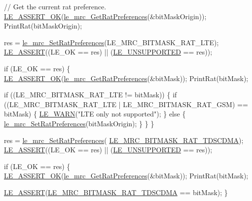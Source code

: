 \begin{DoxyCodeInclude}
{    \textcolor{comment}{// Get the current rat preference.}
    \hyperlink{le__log_8h_a7cd2daa3d4af1de4d29e0eed95187484}{LE\_ASSERT\_OK}(\hyperlink{le__mrc__interface_8h_ae9fa8655738c63e392c8dcc862bdb1d5}{le\_mrc\_GetRatPreferences}(&bitMaskOrigin));
    PrintRat(bitMaskOrigin);

    res = \hyperlink{le__mrc__interface_8h_a2d4abd391bc69c218538f5d8e1be4e01}{le\_mrc\_SetRatPreferences}(LE\_MRC\_BITMASK\_RAT\_LTE);
    \hyperlink{le__log_8h_ac0dbbef91dc0fed449d0092ff0557b39}{LE\_ASSERT}((LE\_OK == res) || (\hyperlink{le__basics_8h_a1cca095ed6ebab24b57a636382a6c86ca5377262702e8434207b03533259e0c5f}{LE\_UNSUPPORTED} == res));

    \textcolor{keywordflow}{if} (LE\_OK == res)
    \{
        \hyperlink{le__log_8h_a7cd2daa3d4af1de4d29e0eed95187484}{LE\_ASSERT\_OK}(\hyperlink{le__mrc__interface_8h_ae9fa8655738c63e392c8dcc862bdb1d5}{le\_mrc\_GetRatPreferences}(&bitMask));
        PrintRat(bitMask);

        \textcolor{keywordflow}{if} ((LE\_MRC\_BITMASK\_RAT\_LTE != bitMask))
        \{
            \textcolor{keywordflow}{if} ((LE\_MRC\_BITMASK\_RAT\_LTE | LE\_MRC\_BITMASK\_RAT\_GSM) == bitMask)
            \{
                \hyperlink{le__log_8h_a0201b2f60ee0e945479f91e181bf04b6}{LE\_WARN}(\textcolor{stringliteral}{"LTE only not supported"});
            \}
            \textcolor{keywordflow}{else}
            \{
                \hyperlink{le__mrc__interface_8h_a2d4abd391bc69c218538f5d8e1be4e01}{le\_mrc\_SetRatPreferences}(bitMaskOrigin);
            \}
        \}
    \}

    res = \hyperlink{le__mrc__interface_8h_a2d4abd391bc69c218538f5d8e1be4e01}{le\_mrc\_SetRatPreferences}(
      \hyperlink{le__mrc__interface_8h_af643c7005da7f2466302eebdf7a29d93a704e1357fc74db4ae2fef1548aa18bcc}{LE\_MRC\_BITMASK\_RAT\_TDSCDMA});
    \hyperlink{le__log_8h_ac0dbbef91dc0fed449d0092ff0557b39}{LE\_ASSERT}((LE\_OK == res) || (\hyperlink{le__basics_8h_a1cca095ed6ebab24b57a636382a6c86ca5377262702e8434207b03533259e0c5f}{LE\_UNSUPPORTED} == res));

    \textcolor{keywordflow}{if} (LE\_OK == res)
    \{
        \hyperlink{le__log_8h_a7cd2daa3d4af1de4d29e0eed95187484}{LE\_ASSERT\_OK}(\hyperlink{le__mrc__interface_8h_ae9fa8655738c63e392c8dcc862bdb1d5}{le\_mrc\_GetRatPreferences}(&bitMask));
        PrintRat(bitMask);

        \hyperlink{le__log_8h_ac0dbbef91dc0fed449d0092ff0557b39}{LE\_ASSERT}(\hyperlink{le__mrc__interface_8h_af643c7005da7f2466302eebdf7a29d93a704e1357fc74db4ae2fef1548aa18bcc}{LE\_MRC\_BITMASK\_RAT\_TDSCDMA} == bitMask);
    \}

}
\end{DoxyCodeInclude}
